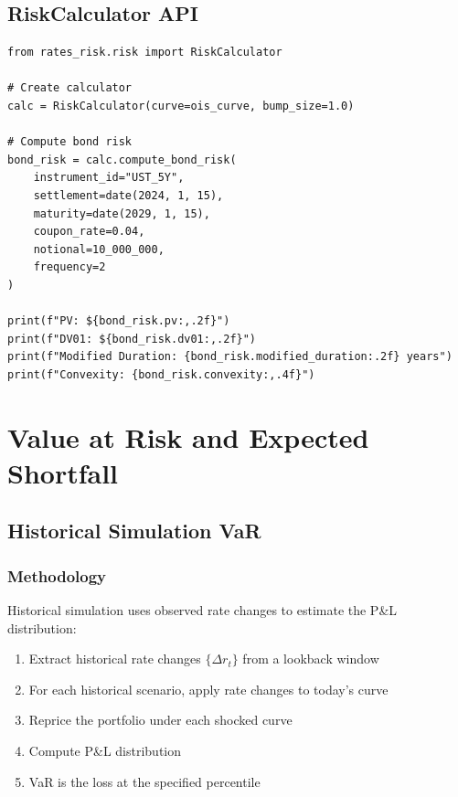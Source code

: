 \documentclass[12pt,a4paper]{report}
\begin{document}
\section{RiskCalculator API}

\begin{lstlisting}
from rates_risk.risk import RiskCalculator

# Create calculator
calc = RiskCalculator(curve=ois_curve, bump_size=1.0)

# Compute bond risk
bond_risk = calc.compute_bond_risk(
    instrument_id="UST_5Y",
    settlement=date(2024, 1, 15),
    maturity=date(2029, 1, 15),
    coupon_rate=0.04,
    notional=10_000_000,
    frequency=2
)

print(f"PV: ${bond_risk.pv:,.2f}")
print(f"DV01: ${bond_risk.dv01:,.2f}")
print(f"Modified Duration: {bond_risk.modified_duration:.2f} years")
print(f"Convexity: {bond_risk.convexity:,.4f}")
\end{lstlisting}

\chapter{Value at Risk and Expected Shortfall}

\section{Historical Simulation VaR}

\subsection{Methodology}

Historical simulation uses observed rate changes to estimate the P\&L distribution:

\begin{enumerate}
    \item Extract historical rate changes $\{\Delta r_t\}$ from a lookback window
    \item For each historical scenario, apply rate changes to today's curve
    \item Reprice the portfolio under each shocked curve
    \item Compute P\&L distribution
    \item VaR is the loss at the specified percentile
\end{enumerate}
\end{document}
